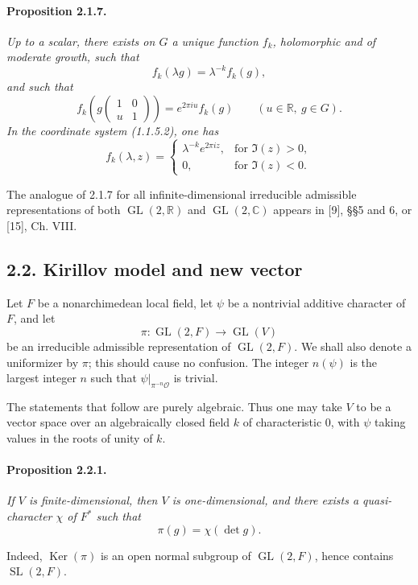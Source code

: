 \documentclass[10pt,a4paper]{article}
\providecommand{\GL}{\operatorname{GL}}
\providecommand{\SL}{\operatorname{SL}}
\providecommand{\Ker}{\operatorname{Ker}}
\providecommand{\R}{\mathbb R}
\providecommand{\C}{\mathbb C}
\begin{document}
\paragraph{Proposition 2.1.7.}{\itshape  Up to a scalar, there exists on \(G\) a unique function \(f_k\), holomorphic and of moderate growth, such that
\[
f_k(\lambda g)=\lambda^{-k}f_k(g),
\]
and such that
\[
f_k\!\left(g\begin{pmatrix}1&0\\u&1\end{pmatrix}\right)
=
e^{2\pi i u}f_k(g)
\qquad(u\in\R,\ g\in G).
\]
In the coordinate system (1.1.5.2), one has
\[
\tag{2.1.7.1}
f_k(\lambda,z)=
\begin{cases}
\lambda^{-k}e^{2\pi iz},& \text{for }\Im(z)>0,\\
0,& \text{for }\Im(z)<0.
\end{cases}
\]

\par}
The analogue of 2.1.7 for all infinite-dimensional irreducible admissible representations of both \(\GL(2,\R)\) and \(\GL(2,\C)\) appears in [9], §§5 and 6, or [15], Ch. VIII.

\subsection*{2.2. Kirillov model and new vector}

Let \(F\) be a nonarchimedean local field, let \(\psi\) be a nontrivial additive character of \(F\), and let
\[
\pi:\GL(2,F)\longrightarrow\GL(V)
\]
be an irreducible admissible representation of \(\GL(2,F)\). We shall also denote a uniformizer by \(\pi\); this should cause no confusion. The integer \(n(\psi)\) is the largest integer \(n\) such that \(\psi|_{\pi^{-n}\mathcal O}\) is trivial.

The statements that follow are purely algebraic. Thus one may take \(V\) to be a vector space over an algebraically closed field \(k\) of characteristic \(0\), with \(\psi\) taking values in the roots of unity of \(k\).

\paragraph{Proposition 2.2.1.}{\itshape  If \(V\) is finite-dimensional, then \(V\) is one-dimensional, and there exists a quasi-character \(\chi\) of \(F^*\) such that
\[
\pi(g)=\chi(\det g).
\]\par}

\clearpage
{}
\hypertarget{authority-25}{}
Indeed, \(\Ker(\pi)\) is an open normal subgroup of \(\GL(2,F)\), hence contains \(\SL(2,F)\).
\end{document}
